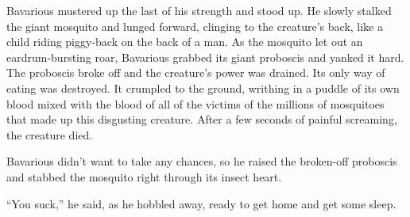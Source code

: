 Bavarious mustered up the last of his strength and stood up. He
slowly stalked the giant mosquito and lunged forward, clinging to
the creature's back, like a child riding piggy-back on the
back of a man. As the mosquito let out an eardrum-bursting roar,
Bavarious grabbed its giant proboscis and yanked it hard. The
proboscis broke off and the creature's power was drained. Its
only way of eating was destroyed. It crumpled to the ground,
writhing in a puddle of its own blood mixed with the blood of all
of the victims of the millions of mosquitoes that made up this
disgusting creature. After a few seconds of painful screaming, the
creature died.



Bavarious didn't want to take any chances, so he raised the
broken-off proboscis and stabbed the mosquito right through its
insect heart.



``You suck,'' he said, as he hobbled away, ready to get
home and get some sleep.


